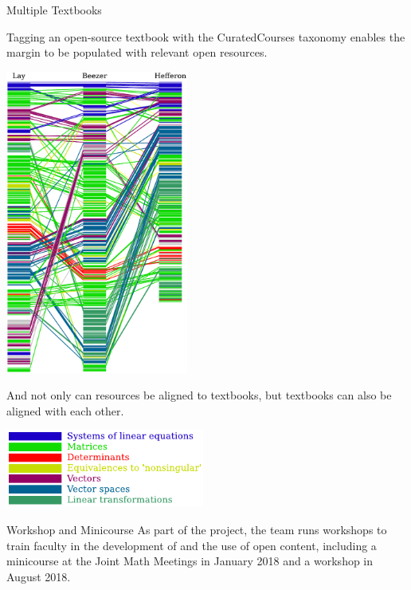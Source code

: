 \begin{sectionblock}{Multiple Textbooks}

  Tagging an open-source textbook with the
  CuratedCourses taxonomy enables the margin to be populated with relevant open
  resources.\vspace{1ex}
  
\vspace{-2ex}\parbox[t][][t]{0.49\textwidth}{\begin{center}\includegraphics[width=0.45\textwidth,valign=t]{alignment.pdf}\end{center}}\parbox[t][][t]{0.49\textwidth}{\begin{flushleft}And not only can resources be aligned to textbooks, but textbooks can also be aligned with each other.\end{flushleft}\vspace{1ex}\begin{center}\includegraphics[width=0.49\textwidth]{legend.pdf}\end{center}}


\end{sectionblock}

\vspace{1ex}

\begin{sectionblock}{Workshop and Minicourse}
  As part of the project, the team runs workshops to train
  faculty in the development of and the use of open content, including
  a minicourse at the Joint Math Meetings in January 2018 and a
   workshop in August 2018.


\end{sectionblock}


